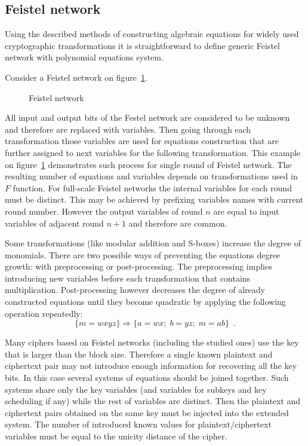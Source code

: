 \subsection{Feistel network}

Using the described methods of constructing algebraic equations for widely used
cryptographic transformations it is straightforward to define generic Feistel
network with polynomial equations system.

Consider a Feistel network on figure~\ref{fig:eq_feistel}.
\begin{figure}[htbp]
	\centering
    
	\caption{Feistel network}
    \label{fig:eq_feistel}
\end{figure}
All input and output bits of the Festel network are considered to be unknown and
therefore are replaced with variables. Then going through each transformation
those variables are used for equations construction that are further assigned to
next variables for the following transformation. This example on
figure~\ref{fig:eq_feistel} demonstrates such process for single round of
Feistel network. The resulting number of equations and variables depends on
transformations used in $F$ function. For full-scale Feistel networks the
internal variables for each round must be distinct. This may be achieved by
prefixing variables names with current round number. However the output
variables of round $n$ are equal to input variables of adjacent round $n+1$ and
therefore are common.

Some transformations (like modular addition and S-boxes) increase the degree of
monomials. There are two possible ways of preventing the equations degree
growth: with preprocessing or post-processing. The preprocessing implies
introducing new variables before each transformation that contains
multiplication. Post-processing however decreases the degree of already
constructed equations until they become quadratic by applying the following
operation repeatedly:
\begin{equation}
\{m = w x y z\} \Rightarrow \{a = wx;\; b = yz;\; m = ab \}\enspace.
\end{equation}

Many ciphers based on Feistel networks (including the studied ones) use the key
that is larger than the block size. Therefore a single known plaintext and
ciphertext pair may not introduce enough information for recovering all the key
bits. In this case several systems of equations should be joined together. Such
systems share only the key variables (and variables for subkeys and key
scheduling if any) while the rest of variables are distinct. Then the plaintext
and ciphertext pairs obtained on the same key must be injected into the extended
system. The number of introduced known values for \mbox{plaintext/ciphertext}
variables must be equal to the unicity distance of the cipher.


